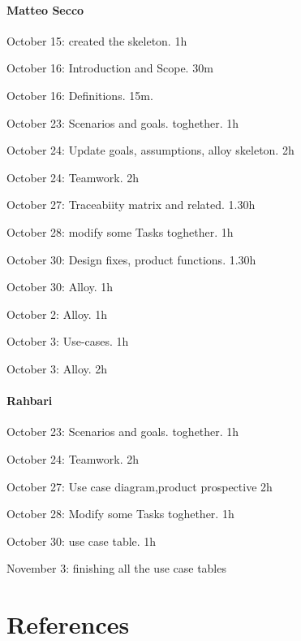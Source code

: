 \documentclass{article}
\begin{document}
	\paragraph{Matteo Secco} 
		\begin{list}{-}{}
			\item October 15: created the skeleton. 1h
			\item October 16: Introduction and Scope. 30m
			\item October 16: Definitions. 15m.
			\item October 23: Scenarios and goals. toghether. 1h
			\item October 24: Update goals, assumptions, alloy skeleton. 2h
			\item October 24: Teamwork. 2h
			\item October 27: Traceabiity matrix and related. 1.30h
			\item October 28: modify some Tasks toghether. 1h
			\item October 30: Design fixes, product functions. 1.30h
			\item October 30: Alloy. 1h
			\item October 2: Alloy. 1h
			\item October 3: Use-cases. 1h
			\item October 3: Alloy. 2h
		\end{list}
		
	\paragraph{Rahbari}
		\begin{list}{-}{}
			\item October 23: Scenarios and goals. toghether. 1h
			\item October 24: Teamwork. 2h
			\item October 27: Use case diagram,product prospective 2h
			\item October 28: Modify some Tasks toghether. 1h
			\item October 30: use case table. 1h
			\item November 3: finishing all the use case tables
		\end{list}
\section{References}
\end{document}
